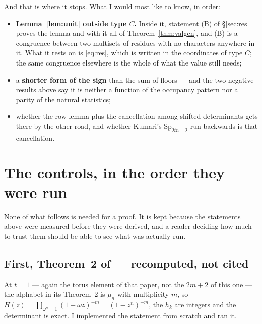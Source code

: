 \documentclass[11pt,a4paper]{article}
\theoremstyle{definition}
\newcommand{\Sp}{\mathrm{Sp}}
\begin{document}
And that is where it stops. What I would most like to know, in order:
\begin{itemize}\itemsep2pt
\item \textbf{Lemma~\ref{lem:unit} outside type $C$.} Inside it, statement (B) of
\S\ref{sec:res} proves the lemma and with it all of Theorem~\ref{thm:valgen}, and (B) is a
congruence between two multisets of residues with no characters anywhere in it. What it rests on is
\eqref{eq:res}, which is written in the coordinates of type $C$; the same congruence elsewhere is
the whole of what the value still needs;
\item a \textbf{shorter form of the sign} than the sum of floors --- and the two negative results
above say it is neither a function of the occupancy pattern nor a parity of the natural statistics;
\item whether the row lemma plus the cancellation among shifted determinants gets there by the
other road, and whether Kumari's $\Sp_{2tn+2}$ \cite{Kum24} run backwards is that cancellation.
\end{itemize}

\section{The controls, in the order they were run}\label{sec:controles}

None of what follows is needed for a proof. It is kept because the statements above were measured
before they were derived, and a reader deciding how much to trust them should be able to see what
was actually run.


\subsection*{First, Theorem~2 of \cite{Prasad16b} --- recomputed, not cited}

At $t=1$ --- again the torus element of that paper, not the $2m+2$ of this one --- the alphabet in
its Theorem~2 is
$\mu_n$ with multiplicity $m$, so
$H(z)=\prod_{\omega^n=1}(1-\omega z)^{-m}=(1-z^n)^{-m}$, the $h_k$ are integers and the determinant
is exact. I implemented the statement from scratch and ran it.
\end{document}
